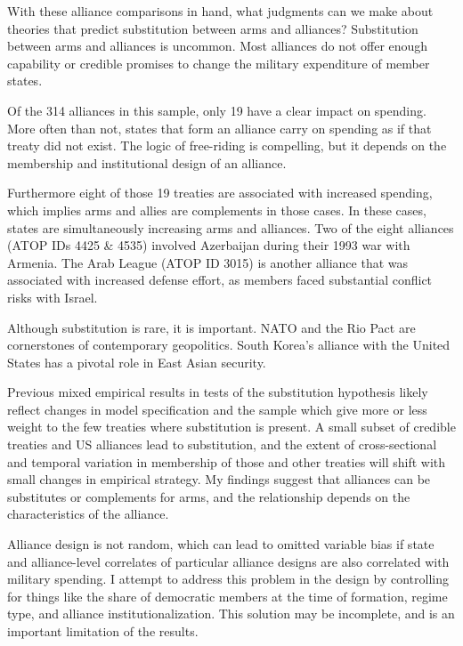 \documentclass[12pt]{article}
\begin{document}
With these alliance comparisons in hand, what judgments can we make about theories that predict substitution between arms and alliances? Substitution between arms and alliances is uncommon. Most alliances do not offer enough capability or credible promises to change the military expenditure of member states. 

Of the 314 alliances in this sample, only 19 have a clear impact on spending. More often than not, states that form an alliance carry on spending as if that treaty did not exist. The logic of free-riding is compelling, but it depends on the membership and institutional design of an alliance.

Furthermore eight of those 19 treaties are associated with increased spending, which implies arms and allies are complements in those cases. In these cases, states are simultaneously increasing arms and alliances. Two of the eight alliances (ATOP IDs 4425 \& 4535) involved Azerbaijan during their 1993 war with Armenia. The Arab League (ATOP ID 3015) is another alliance that was associated with increased defense effort, as members faced substantial conflict risks with Israel. 

Although substitution is rare, it is important. NATO and the Rio Pact are cornerstones of contemporary geopolitics. South Korea's alliance with the United States has a pivotal role in East Asian security. 

Previous mixed empirical results in tests of the substitution hypothesis likely reflect changes in model specification and the sample which give more or less weight to the few treaties where substitution is present. A small subset of credible treaties and US alliances lead to substitution, and the extent of cross-sectional and temporal variation in membership of those and other treaties will shift with small changes in empirical strategy. My findings suggest that alliances can be substitutes or complements for arms, and the relationship depends on the characteristics of the alliance. 

Alliance design is not random, which can lead to omitted variable bias if state and alliance-level correlates of particular alliance designs are also correlated with military spending. I attempt to address this problem in the design by controlling for things like the share of democratic members at the time of formation, regime type, and alliance institutionalization. This solution may be incomplete, and is an important limitation of the results. 
\end{document}
